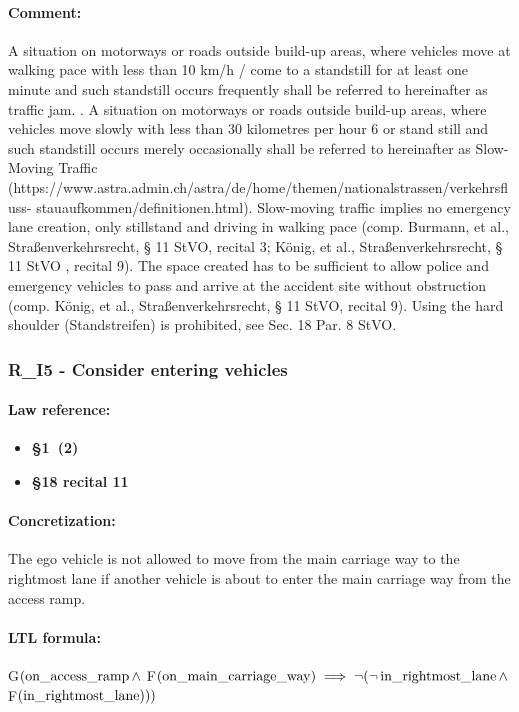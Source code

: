 \paragraph{Comment:} A situation on motorways or roads outside build-up areas, where vehicles move at walking pace with less than 10 km/h / come to a standstill for at least one minute and
such standstill occurs frequently shall be referred to hereinafter as traffic jam.  . A situation on motorways or roads outside build-up areas, where vehicles move slowly with less than 30 kilometres per hour 6 or stand still and such standstill occurs merely occasionally shall be referred to hereinafter as Slow-Moving Traffic (https://www.astra.admin.ch/astra/de/home/themen/nationalstrassen/verkehrsfluss-
stauaufkommen/definitionen.html). Slow-moving traffic implies no emergency lane creation, only stillstand and driving in walking pace (comp. Burmann, et al., Straßenverkehrsrecht,
§ 11 StVO, recital 3; König, et al., Straßenverkehrsrecht, § 11 StVO , recital 9). The space created has to be sufficient to allow police and emergency vehicles to pass and arrive at
the accident site without obstruction (comp. König, et al., Straßenverkehrsrecht, § 11 StVO, recital 9). Using the hard shoulder (Standstreifen) is prohibited, see Sec. 18 Par. 8 StVO.

\subsubsection{R\_I5 - Consider entering vehicles}
\paragraph{Law reference:}
\begin{itemize}
	\item \textbf{\stvo \S 1~(2)} 
	\item \textbf{\stvo \S 18 recital 11}
\end{itemize}
\paragraph{Concretization:} The ego vehicle is not allowed to move from the main carriage way to the rightmost lane if another vehicle is about to enter the main carriage way from the access ramp.
\paragraph{LTL formula:} G$(\operatorname*{on\_access\_ramp} \land$ F$(\operatorname*{on\_main\_carriage\_way}) \implies \neg (\neg \operatorname*{in\_rightmost\_lane} \land $ F$(\operatorname*{in\_rightmost\_lane})))$



